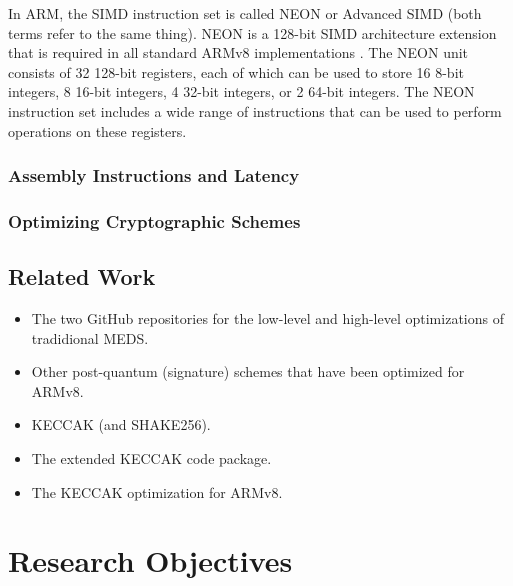 \documentclass[11pt,a4paper]{report}
\theoremstyle{definition}
\begin{document}
In ARM, the SIMD instruction set is called NEON or Advanced SIMD (both terms refer to the same thing). NEON is a 128-bit SIMD architecture extension that is required in all standard ARMv8 implementations \cite{ARMv8A-ProgrammersGuide}. The NEON unit consists of 32 128-bit registers, each of which can be used to store 16 8-bit integers, 8 16-bit integers, 4 32-bit integers, or 2 64-bit integers. The NEON instruction set includes a wide range of instructions that can be used to perform operations on these registers.

\subsection{Assembly Instructions and Latency}

\subsection{Optimizing Cryptographic Schemes}

\section{Related Work}
\begin{itemize}
  \item The two GitHub repositories for the low-level and high-level optimizations of tradidional MEDS.
  \item Other post-quantum (signature) schemes that have been optimized for ARMv8.
  \item KECCAK (and SHAKE256).
  \item The extended KECCAK code package.
  \item The KECCAK optimization for ARMv8.
\end{itemize}

\chapter{Research Objectives}
\label{ch:researchobjectives}
\end{document}
